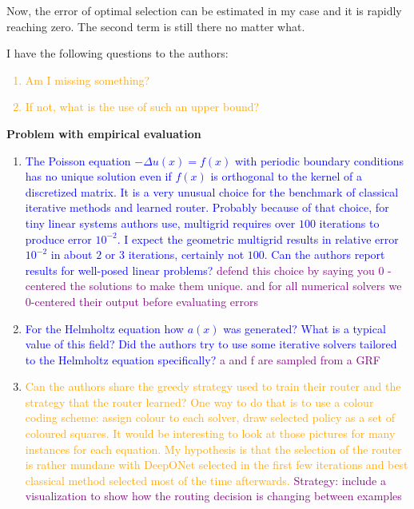 \documentclass[12pt]{article}
\begin{document}
Now, the error of optimal selection can be estimated in my case and it is rapidly reaching zero. The second term is still there no matter what.

I have the following questions to the authors:

\textcolor{orange}{
\begin{enumerate}
    \item Am I missing something?
    \item If not, what is the use of such an upper bound?
\end{enumerate}}

\textbf{Problem with empirical evaluation}

\begin{enumerate}
    \item \textcolor{blue}{The Poisson equation $- \Delta u(x) = f(x)$ with periodic boundary conditions has no unique solution even if $f(x)$ is orthogonal to the kernel of a discretized matrix. It is a very unusual choice for the benchmark of classical iterative methods and learned router. Probably because of that choice, for tiny linear systems authors use, multigrid requires over $100$ iterations to produce error $10^{-2}$. I expect the geometric multigrid results in relative error $10^{-2}$ in about $2$ or $3$ iterations, certainly not $100$. Can the authors report results for well-posed linear problems?} \textcolor{purple}{defend this choice by saying you 0 - centered the solutions to make them unique. and for all numerical solvers we 0-centered their output before evaluating errors}
    \item \textcolor{blue}{For the Helmholtz equation how $a(x)$ was generated? What is a typical value of this field? Did the authors try to use some iterative solvers tailored to the Helmholtz equation specifically?} \textcolor{purple}{ a and f are sampled from a GRF }
    \item \textcolor{orange}{Can the authors share the greedy strategy used to train their router and the strategy that the router learned? One way to do that is to use a colour coding scheme: assign colour to each solver, draw selected policy as a set of coloured squares. It would be interesting to look at those pictures for many instances for each equation. My hypothesis is that the selection of the router is rather mundane with DeepONet selected in the first few iterations and best classical method selected most of the time afterwards.} \textcolor{purple}{Strategy: include a visualization to show how the routing decision is changing between examples}
\end{enumerate}
\end{document}
